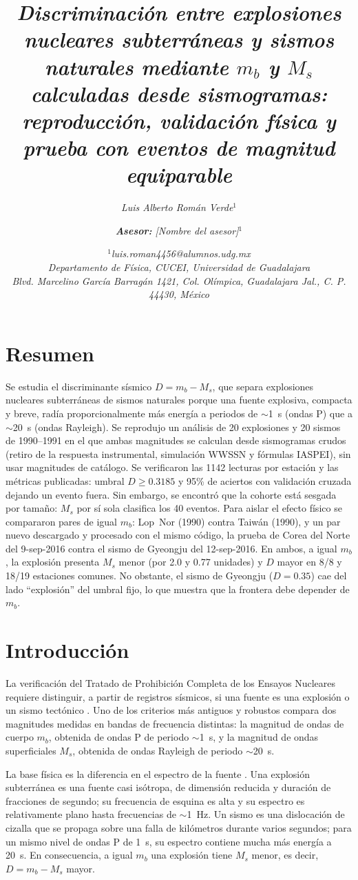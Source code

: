 \documentclass[letterpaper,12pt]{article}
\title{\fontsize{0.5cm}{0.5cm}\selectfont
\textit{\textbf{Discriminación entre explosiones nucleares subterráneas y sismos naturales mediante $m_b$ y $M_s$ calculadas desde sismogramas: reproducción, validación física y prueba con eventos de magnitud equiparable}}
}
\author{ \fontsize{0.35cm}{0.5cm}\selectfont
\textit{Luis Alberto Román Verde$^1$} \\
        \and \fontsize{0.35cm}{0.5cm}\selectfont \textit{\textbf{Asesor:} [Nombre del asesor]$^1$}
	}
\date{\small
  $^1$\fontsize{0.35cm}{0.5cm}\selectfont \textit{luis.roman4456@alumnos.udg.mx\\ Departamento de Física, CUCEI, Universidad de Guadalajara\\
    Blvd. Marcelino García Barragán 1421, Col. Olímpica, Guadalajara Jal., C. P. 44430, México}\\[2ex]
  }
\begin{document}
\maketitle
\thispagestyle{fancy}

\section*{Resumen}
Se estudia el discriminante sísmico $D=m_b-M_s$, que separa explosiones nucleares subterráneas de sismos naturales porque una fuente explosiva, compacta y breve, radía proporcionalmente más energía a periodos de $\sim$1~s (ondas P) que a $\sim$20~s (ondas Rayleigh). Se reprodujo un análisis de 20 explosiones y 20 sismos de 1990--1991 en el que ambas magnitudes se calculan desde sismogramas crudos (retiro de la respuesta instrumental, simulación WWSSN y fórmulas IASPEI), sin usar magnitudes de catálogo. Se verificaron las 1142 lecturas por estación y las métricas publicadas: umbral $D\geq0.3185$ y 95\% de aciertos con validación cruzada dejando un evento fuera. Sin embargo, se encontró que la cohorte está sesgada por tamaño: $M_s$ por sí sola clasifica los 40 eventos. Para aislar el efecto físico se compararon pares de igual $m_b$: Lop~Nor (1990) contra Taiwán (1990), y un par nuevo descargado y procesado con el mismo código, la prueba de Corea del Norte del 9-sep-2016 contra el sismo de Gyeongju del 12-sep-2016. En ambos, a igual $m_b$, la explosión presenta $M_s$ menor (por 2.0 y 0.77 unidades) y $D$ mayor en 8/8 y 18/19 estaciones comunes. No obstante, el sismo de Gyeongju ($D=0.35$) cae del lado ``explosión'' del umbral fijo, lo que muestra que la frontera debe depender de $m_b$.

\section*{Introducción}
La verificación del Tratado de Prohibición Completa de los Ensayos Nucleares requiere distinguir, a partir de registros sísmicos, si una fuente es una explosión o un sismo tectónico \cite{bowers}. Uno de los criterios más antiguos y robustos compara dos magnitudes medidas en bandas de frecuencia distintas: la magnitud de ondas de cuerpo $m_b$, obtenida de ondas P de periodo $\sim$1~s, y la magnitud de ondas superficiales $M_s$, obtenida de ondas Rayleigh de periodo $\sim$20~s.

La base física es la diferencia en el espectro de la fuente \cite{stevens}. Una explosión subterránea es una fuente casi isótropa, de dimensión reducida y duración de fracciones de segundo; su frecuencia de esquina es alta y su espectro es relativamente plano hasta frecuencias de $\sim$1~Hz. Un sismo es una dislocación de cizalla que se propaga sobre una falla de kilómetros durante varios segundos; para un mismo nivel de ondas P de 1~s, su espectro contiene mucha más energía a 20~s. En consecuencia, a igual $m_b$ una explosión tiene $M_s$ menor, es decir, $D=m_b-M_s$ mayor.
\end{document}
